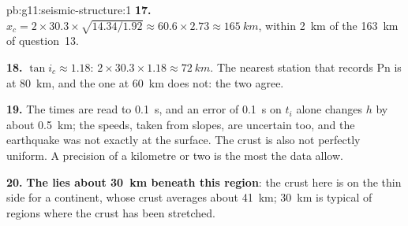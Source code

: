 \begin{solution}{pb:g11:seismic-structure:1}
\textbf{17.} $x_c = 2 \times 30.3 \times \sqrt{14.34/1.92} \approx 60.6 \times
2.73 \approx \qty{165}{km}$, within \qty{2}{km} of the \qty{163}{km} of
question~13.

\textbf{18.} $\tan i_c \approx 1.18$: $2 \times 30.3 \times 1.18 \approx
\qty{72}{km}$. The nearest station that records Pn is at \qty{80}{km}, and
the one at \qty{60}{km} does not: the two agree.

\textbf{19.} The times are read to \qty{0.1}{s}, and an error of
\qty{0.1}{s} on $t_i$ alone changes $h$ by about \qty{0.5}{km}; the speeds,
taken from slopes, are uncertain too, and the earthquake was not exactly at
the surface. The crust is also not perfectly uniform. A precision of a
kilometre or two is the most the data allow.

\textbf{20.} \textbf{The  lies about \qty{30}{km} beneath this region}:
the crust here is on the thin side for a continent, whose crust averages about
\qty{41}{km}; \qty{30}{km} is typical of regions where the crust has been
stretched.
\end{solution}
